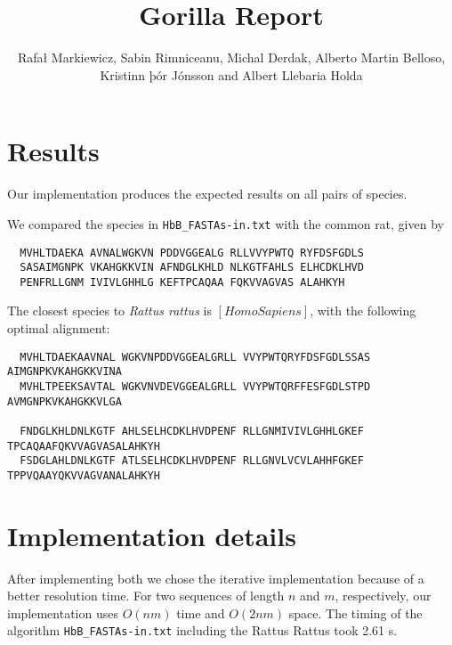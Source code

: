 \documentclass{tufte-handout}
\title{Gorilla Report}
\author{Rafał Markiewicz, Sabin Rimniceanu, Michal Derdak, Alberto Martin Belloso, Kristinn þór Jónsson and Albert Llebaria Holda}
\begin{document}
  \maketitle

  \section{Results}

  Our implementation produces the expected results on all pairs of species.%
  
  We compared the species in \verb!HbB_FASTAs-in.txt!
  with the common rat, given by

  \begin{verbatim}
  MVHLTDAEKA AVNALWGKVN PDDVGGEALG RLLVVYPWTQ RYFDSFGDLS
  SASAIMGNPK VKAHGKKVIN AFNDGLKHLD NLKGTFAHLS ELHCDKLHVD
  PENFRLLGNM IVIVLGHHLG KEFTPCAQAA FQKVVAGVAS ALAHKYH
  \end{verbatim}

  The closest species to \emph{Rattus rattus} is $[Homo Sapiens]$, with the following optimal alignment:

\medskip
  \begin{fullwidth}\small
  \begin{verbatim}
  MVHLTDAEKAAVNAL WGKVNPDDVGGEALGRLL VVYPWTQRYFDSFGDLSSAS AIMGNPKVKAHGKKVINA
  MVHLTPEEKSAVTAL WGKVNVDEVGGEALGRLL VVYPWTQRFFESFGDLSTPD AVMGNPKVKAHGKKVLGA

  FNDGLKHLDNLKGTF AHLSELHCDKLHVDPENF RLLGNMIVIVLGHHLGKEF TPCAQAAFQKVVAGVASALAHKYH
  FSDGLAHLDNLKGTF ATLSELHCDKLHVDPENF RLLGNVLVCVLAHHFGKEF TPPVQAAYQKVVAGVANALAHKYH

  \end{verbatim}
\end{fullwidth}



  \section{Implementation details}

  After implementing both we chose the iterative implementation because of a better resolution time.
  For two sequences of length $n$ and $m$, respectively, our implementation uses $O(nm)$ time and
  $O(2nm)$ space. The timing of the algorithm  \verb!HbB_FASTAs-in.txt! including the Rattus Rattus took 2.61 s. 
\end{document}
